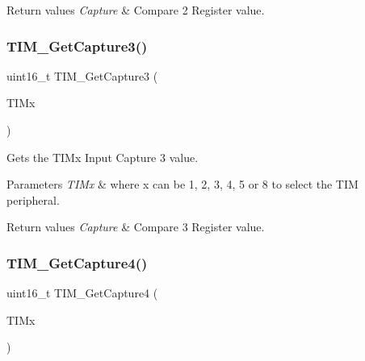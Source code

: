 \begin{DoxyRetVals}{Return values}
{\em Capture} & Compare 2 Register value. \\
\hline
\end{DoxyRetVals}
\mbox{\label{group___t_i_m___exported___functions_gab71d1d3d8a15f3be9e74dca51fcca5fa}} 
\subsubsection{\texorpdfstring{TIM\_GetCapture3()}{TIM\_GetCapture3()}}
{\footnotesize\ttfamily uint16\+\_\+t T\+I\+M\+\_\+\+Get\+Capture3 (\begin{DoxyParamCaption}\item[{\mbox{\hyperlink{struct_t_i_m___type_def}{T\+I\+M\+\_\+\+Type\+Def}} $\ast$}]{T\+I\+Mx }\end{DoxyParamCaption})}



Gets the T\+I\+Mx Input Capture 3 value. 


\begin{DoxyParams}{Parameters}
{\em T\+I\+Mx} & where x can be 1, 2, 3, 4, 5 or 8 to select the T\+IM peripheral. \\
\hline
\end{DoxyParams}

\begin{DoxyRetVals}{Return values}
{\em Capture} & Compare 3 Register value. \\
\hline
\end{DoxyRetVals}
\mbox{\label{group___t_i_m___exported___functions_ga09049af04c8345849c6f82ccfae242a6}} 
\subsubsection{\texorpdfstring{TIM\_GetCapture4()}{TIM\_GetCapture4()}}
{\footnotesize\ttfamily uint16\+\_\+t T\+I\+M\+\_\+\+Get\+Capture4 (\begin{DoxyParamCaption}\item[{\mbox{\hyperlink{struct_t_i_m___type_def}{T\+I\+M\+\_\+\+Type\+Def}} $\ast$}]{T\+I\+Mx }\end{DoxyParamCaption})}



